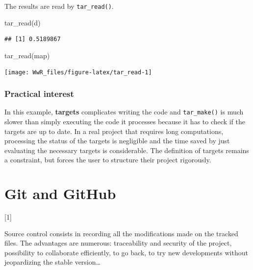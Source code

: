 \documentclass[
  12pt,
  american,
  a4paper,
  extrafontsizes,onecolumn,openright
  ]{memoir}
\newenvironment{Shaded}{\begin{snugshade}}{\end{snugshade}}
\newcommand{\FunctionTok}[1]{\textcolor[rgb]{0.00,0.00,0.00}{#1}}
\newcommand{\NormalTok}[1]{#1}
\newcommand{\toc}[1]{%
  \startcontents[chapters]%
  \printcontents[chapters]{}{1}[#1]{}%
  ~\newline%
}
\begin{document}
The results are read by \texttt{tar\_read()}.

\scriptsize

\begin{Shaded}
\begin{Highlighting}[]
\FunctionTok{tar\_read}\NormalTok{(d)}
\end{Highlighting}
\end{Shaded}

\begin{verbatim}
## [1] 0.5189867
\end{verbatim}

\begin{Shaded}
\begin{Highlighting}[]
\FunctionTok{tar\_read}\NormalTok{(map)}
\end{Highlighting}
\end{Shaded}

\begin{center}\texttt{[image: WwR\_files/figure-latex/tar\_read-1]} \end{center}

\normalsize

\hypertarget{practical-interest}{%
\subsection{Practical interest}\label{practical-interest}}

In this example, \textbf{targets} complicates writing the code and \texttt{tar\_make()} is much slower than simply executing the code it processes because it has to check if the targets are up to date.
In a real project that requires long computations, processing the status of the targets is negligible and the time saved by just evaluating the necessary targets is considerable.
The definition of targets remains a constraint, but forces the user to structure their project rigorously.

\hypertarget{chap-git}{%
\chapter{Git and GitHub}\label{chap-git}}

\toc{1}

Source control consists in recording all the modifications made on the tracked files.
The advantages are numerous: traceability and security of the project, possibility to collaborate efficiently, to go back, to try new developments without jeopardizing the stable version\ldots{}
\end{document}
